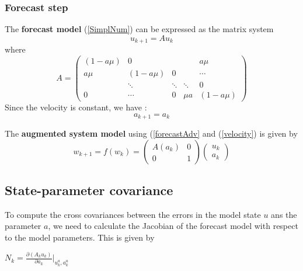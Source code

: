 \documentclass[a4,12pt]{article}
\numberwithin{equation}{section}
\begin{document}
\subsubsection{Forecast step}
The \textbf{forecast model} (\ref{SimplNum}) can be expressed as the matrix system 
\begin{equation}
u_{k+1} = A  u_k 
\label{forecastAdv}
\end{equation}
where 
\[A = 
\begin{pmatrix}
(1-a\mu)  & 0&   &  &a\mu \\
 a\mu  & (1-a\mu) & 0&  &\cdots \\
 &\ddots & \ddots &\ddots & 0 \\
 0 & \cdots & 0 & \mu a & (1-a\mu)
\end{pmatrix}
\]
Since the velocity is constant, we have :
\begin{equation}
a_{k+1} = a_k 
\label{velocity}
\end{equation}


The \textbf{augmented system model} using (\ref{forecastAdv} and (\ref{velocity}) is given by 
\begin{equation}
w_{k+1} = f(w_k) = 
\begin{pmatrix}
A(a_k) & 0\\
0 & 1
\end{pmatrix} 
\begin{pmatrix}
u_k\\
a_k
\end{pmatrix} 
\label{MatrixA}
\end{equation}

\subsection{State-parameter covariance}
To compute the cross covariances between the errors in the model state $u$ ans the parameter $a$, we need to calculate the Jacobian of the forecast model with respect to the model parameters. This is given by 
\begin{center}
    $N_k  = \frac{\partial (A_k u_k)}{\partial a_k} \big|_{u_k^a, a_k^a}$
\end{center}
\end{document}
